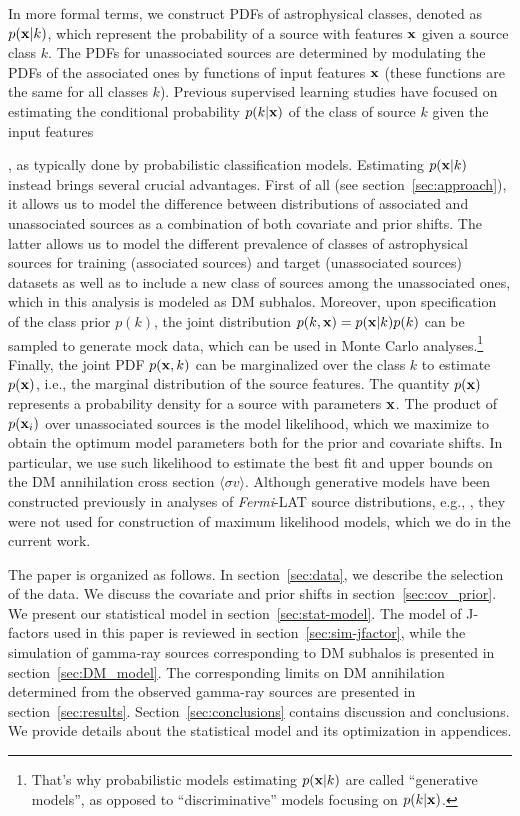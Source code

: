 \documentclass[12pt, a4paper]{article}
\newcommand{\Fermi}{{\textit{Fermi}}}
\newcommand{\bx}{{\bf x}}
\newcommand{\sigmav}{\langle \sigma v \rangle}
\newcommand{\FermiMLclassif}{
\cite{2012ApJ...753...83A, 2016ApJ...825...69M, 2016ApJ...820....8S, 2017A&A...602A..86L, 2019JCAP...11..045C, 2020MNRAS.492.5377L, 2020MNRAS.495.1093H, 2021RAA....21...15Z, 2021MNRAS.505.5853G, 2022A&A...660A..87B, 2023JCAP...07..033B, 2023MNRAS.521.6195M, 2023RASTI...2..735M, 2023MNRAS.520.1348G}}
\begin{document}
In more formal terms, 
we construct PDFs of astrophysical classes, denoted as $p(\bx|k)$,
which represent the probability of a source with features $\bx$ given a source class $k$. 
The PDFs for unassociated sources are determined by modulating the PDFs of the associated ones by functions of input features $\bx$ (these functions are the same for all classes $k$).
Previous supervised learning studies have focused on estimating the conditional probability $p(k|\bx)$ of the class of source $k$ given the input features 
\FermiMLclassif, as typically done by probabilistic classification models.
Estimating $p(\bx|k)$ instead brings several crucial advantages. First of all (see section~\ref{sec:approach}), it allows us to model the difference between distributions of associated and unassociated sources as a combination of both covariate and prior shifts.
The latter allows us to model the different prevalence of classes of astrophysical sources for training (associated sources) and target (unassociated sources) datasets as well as to include a new class of sources among the unassociated ones, which in this analysis is modeled as DM subhalos.
Moreover, upon specification of the class prior $p(k)$, the joint distribution $p(k,\bx)=p(\bx|k)p(k)$ can be sampled to generate mock data, which can be used in Monte Carlo analyses.\footnote{That's why probabilistic models estimating $p(\bx|k)$ are called ``generative models'', as opposed to ``discriminative'' models focusing on $p(k|\bx)$.} Finally, the joint PDF  $p(\bx, k)$ can be marginalized over the class $k$ to estimate $p(\bx)$, i.e., the marginal distribution of the source features. 
The quantity $p(\bx)$
represents a probability density for a source with parameters $\bx$. 
The product of $p(\bx_i)$ over unassociated sources is the model likelihood, which we maximize to obtain the optimum model parameters both for the prior and covariate shifts.
In particular, we use such likelihood to estimate the best fit and upper bounds on the DM annihilation cross section $\sigmav$.
Although generative models have been constructed previously in analyses of \Fermi-LAT source distributions, e.g., \cite{2023MNRAS.520.1348G}, they were not used for construction of maximum likelihood models, which we do in the current work.

The paper is organized as follows.
In section~\ref{sec:data},
we describe the selection of the data.
We discuss the covariate and prior shifts in section~\ref{sec:cov_prior}. We present our statistical model in section~\ref{sec:stat-model}. 
The model of J-factors used in this paper is reviewed in section~\ref{sec:sim-jfactor}, while the simulation of gamma-ray sources corresponding to DM subhalos is presented in section~\ref{sec:DM_model}. 
The corresponding limits on DM annihilation determined from the observed gamma-ray sources are presented in section~\ref{sec:results}.
Section~\ref{sec:conclusions} contains discussion and conclusions. 
We provide details about the statistical model and its optimization in appendices.
\end{document}

